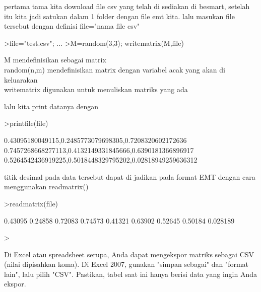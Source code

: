 \documentclass[a4paper,10pt]{article}
\begin{document}
\begin{eulernotebook}
\begin{eulercomment}
\begin{eulercomment}
\begin{eulercomment}
\begin{eulercomment}
\begin{eulercomment}
\begin{eulercomment}
\begin{eulercomment}
\begin{eulercomment}
\begin{eulercomment}
\begin{eulercomment}
\begin{eulercomment}
pertama tama kita download file csv yang telah di sediakan di besmart,
setelah itu kita jadi satukan dalam 1 folder dengan file emt kita.
lalu masukan file tersebut dengan definisi file="nama file csv"
\end{eulercomment}
\begin{eulerprompt}
>file="test.csv";  ...
>M=random(3,3); writematrix(M,file)
\end{eulerprompt}
\begin{eulercomment}
M mendefinisikan sebagai matrix\\
random(n,m) mendefinisikan matrix dengan variabel acak yang akan di
keluarakan\\
writematrix digunakan untuk menuliskan matriks yang ada

lalu kita print datanya dengan
\end{eulercomment}
\begin{eulerprompt}
>printfile(file)
\end{eulerprompt}
\begin{euleroutput}
  0.43095180049115,0.2485773079698305,0.7208320602172636
  0.7457268668277113,0.4132149331845666,0.6390181366896917
  0.5264542436919225,0.5018448329795202,0.02818949259636312
  
\end{euleroutput}
\begin{eulercomment}
titik desimal pada data tersebut dapat di jadikan pada format EMT
dengan cara menggunakan readmatrix()
\end{eulercomment}
\begin{eulerprompt}
>readmatrix(file)
\end{eulerprompt}
\begin{euleroutput}
    0.43095   0.24858   0.72083 
    0.74573   0.41321   0.63902 
    0.52645   0.50184  0.028189 
\end{euleroutput}
\begin{eulerprompt}
> 
\end{eulerprompt}
\begin{eulercomment}
Di Excel atau spreadsheet serupa, Anda dapat mengekspor matriks
sebagai CSV (nilai dipisahkan koma). Di Excel 2007, gunakan "simpan
sebagai" dan "format lain", lalu pilih "CSV". Pastikan, tabel saat ini
hanya berisi data yang ingin Anda ekspor.


\end{eulercomment}
\end{eulercomment}
\end{eulercomment}
\end{eulercomment}
\end{eulercomment}
\end{eulercomment}
\end{eulercomment}
\end{eulercomment}
\end{eulercomment}
\end{eulercomment}
\end{eulercomment}
\end{eulernotebook}
\end{document}
